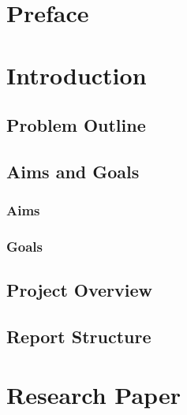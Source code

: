 \documentclass[12pt,leqno]{report}
\begin{document}

\sloppy
\title{}
\author{\LARGE{Valentin Gorbunov}}
\maketitle

\begin{abstract}

  A brief summary.
  \thefontsize{}
  
\end{abstract}


\tableofcontents

\chapter{Preface}

\chapter{Introduction}

\section{Problem Outline}
\section{Aims and Goals}
\subsection{Aims}
\subsection{Goals}
\section{Project Overview}
\section{Report Structure}

\chapter{Research Paper}
\end{document}
